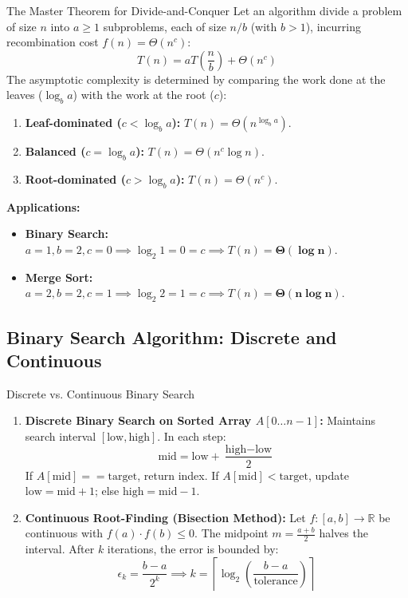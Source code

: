 \begin{theorembox}{The Master Theorem for Divide-and-Conquer}
 
Let an algorithm divide a problem of size $n$ into $a \ge 1$ subproblems, each of size $n/b$ (with $b > 1$), incurring recombination cost $f(n) = \Theta(n^c)$:
\begin{equation}
T(n) = a T\left(\frac{n}{b}\right) + \Theta(n^c)
\end{equation}
The asymptotic complexity is determined by comparing the work done at the leaves ($\log_b a$) with the work at the root ($c$):
\begin{enumerate}
    \item \textbf{Leaf-dominated ($c < \log_b a$):} $T(n) = \Theta(n^{\log_b a})$.
    \item \textbf{Balanced ($c = \log_b a$):} $T(n) = \Theta(n^c \log n)$.
    \item \textbf{Root-dominated ($c > \log_b a$):} $T(n) = \Theta(n^c)$.
\end{enumerate}
\textbf{Applications:}
\begin{itemize}
    \item \textbf{Binary Search:} $a = 1, b = 2, c = 0 \implies \log_2 1 = 0 = c \implies T(n) = \mathbf{\Theta(\log n)}$.
    \item \textbf{Merge Sort:} $a = 2, b = 2, c = 1 \implies \log_2 2 = 1 = c \implies T(n) = \mathbf{\Theta(n \log n)}$.
\end{itemize}
\end{theorembox}

\subsection{Binary Search Algorithm: Discrete and Continuous}

\begin{definitionbox}{Discrete vs. Continuous Binary Search}
 
\begin{enumerate}
    \item \textbf{Discrete Binary Search on Sorted Array $A[0 \dots n-1]$:}
    Maintains search interval $[\text{low}, \text{high}]$. In each step:
    \begin{equation}
    \text{mid} = \text{low} + \frac{\text{high} - \text{low}}{2}
    \end{equation}
    If $A[\text{mid}] == \text{target}$, return index. If $A[\text{mid}] < \text{target}$, update $\text{low} = \text{mid} + 1$; else $\text{high} = \text{mid} - 1$.
    \item \textbf{Continuous Root-Finding (Bisection Method):}
    Let $f: [a, b] \to \mathbb{R}$ be continuous with $f(a) \cdot f(b) \le 0$. The midpoint $m = \frac{a+b}{2}$ halves the interval. After $k$ iterations, the error is bounded by:
    \begin{equation}
    \epsilon_k = \frac{b - a}{2^k} \implies k = \left\lceil \log_2\left(\frac{b - a}{\text{tolerance}}\right) \right\rceil
    \end{equation}
\end{enumerate}
\end{definitionbox}

